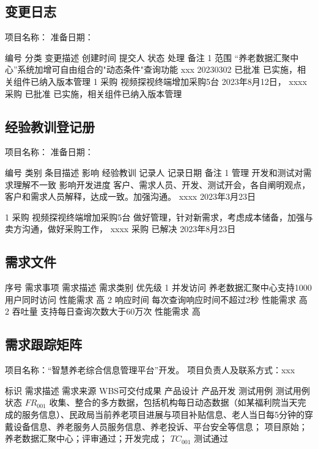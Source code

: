 \documentclass[UTF8]{../computerUniverse}
\begin{document}
\subsection{变更日志}

项目名称：
准备日期：

编号    分类    变更描述    创建时间    提交人    状态    处理    备注
1       范围    “养老数据汇聚中心”系统加增可自由组合的"动态条件"查询功能
xxx    20230302    已批准    已实施，相关组件已纳入版本管理
1       采购    视频探视终端增加采购5台   2023年8月12日，    
xxxx  采购   已批准   已实施，相关组件已纳入版本管理


\subsection{经验教训登记册}

项目名称：
准备日期：

编号    类别    条目描述    影响    经验教训    记录人    记录日期   备注
1       管理    开发和测试对需求理解不一致    影响开发进度
客户、需求人员、开发、测试开会，各自阐明观点，客户和需求人员解释，达成一致。加强沟通。     xxxx    2023年3月23日

1       采购    视频探视终端增加采购5台   做好管理，针对新需求，考虑成本储备，加强与卖方沟通，做好采购工作，    xxxx  采购    已解决    2023年8月23日



\subsection{需求文件}


序号    需求事项     需求描述       需求类别    优先级
1       并发访问    养老数据汇聚中心支持1000用户同时访问    性能需求    高
2       响应时间    每次查询响应时间不超过2秒           性能需求    高
2       吞吐量      支持每日查询次数大于60万次          性能需求    高


\subsection{需求跟踪矩阵}
项目名称：“智慧养老综合信息管理平台”开发。
项目负责人及联系方式：xxx


标识        需求描述    需求来源  WBS可交付成果   产品设计    产品开发    测试用例  测试用例状态
$FR_001$     收集、整合的多方数据，包括机构每日动态数据（如某福利院当天完成的服务信息）、民政局当前养老项目进展与项目补贴信息、老人当日每5分钟的穿戴设备信息、养老服务人员服务信息、养老投诉、平台安全等信息；
项目原始；养老数据汇聚中心；评审通过；开发完成；    $TC_001$  测试通过
\end{document}

